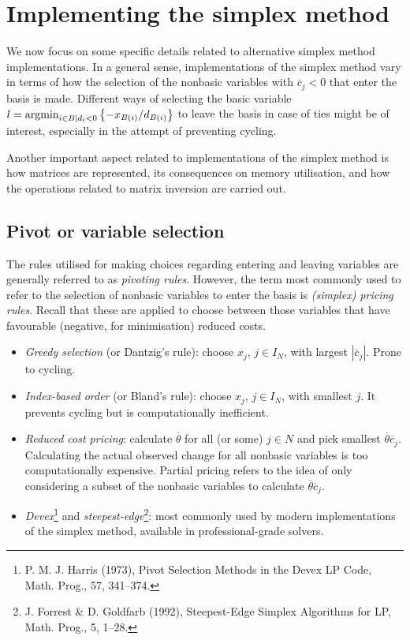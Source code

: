 \section{Implementing the simplex method}

We now focus on some specific details related to alternative simplex method implementations. In a general sense, implementations of the simplex method vary in terms of how the selection of the nonbasic variables with $\overline{c}_j < 0$ that enter the basis is made. Different ways of selecting the basic variable $l = \mathop{\rm argmin}_{i \in B \mid d_i <0}\left\{ -x_{B(i)}/d_{B(i)} \right \}$ to leave the basis in case of ties might be of interest, especially in the attempt of preventing cycling.

Another important aspect related to implementations of the simplex method is how matrices are represented, its consequences on memory utilisation, and how the operations related to matrix inversion are carried out. 


\subsection{Pivot or variable selection}

The rules utilised for making choices regarding entering and leaving variables are generally referred to as \emph{pivoting rules}. However, the term most commonly used to refer to the selection of nonbasic variables to enter the basis is \emph{(simplex) pricing rules}. Recall that these are applied to choose between those variables that have favourable (negative, for minimisation) reduced costs.

\begin{itemize}
	\item \emph{Greedy selection} (or Dantzig's rule): choose $x_j$, $j \in I_N$, with largest $|\overline{c}_j|$. Prone to cycling.
	\item \emph{Index-based order} (or Bland's rule): choose $x_j$,  $j \in I_N$, with smallest $j$. It prevents cycling but is computationally inefficient. 
	\item \emph{Reduced cost pricing}: calculate $\overline{\theta}$ for all (or some) $j \in N$ and pick smallest $\overline{\theta}\overline{c}_j$. Calculating the actual observed change for all nonbasic variables is too computationally expensive. Partial pricing refers to the idea of only considering a subset of the nonbasic variables to calculate $\overline{\theta}\overline{c}_j$.
	\item \emph{Devex}\footnote{P. M. J. Harris (1973), Pivot Selection Methods in the Devex LP Code, Math. Prog., 57, 341--374.} and \emph{steepest-edge}\footnote{J. Forrest \& D. Goldfarb (1992), Steepest-Edge Simplex Algorithms for LP, Math. Prog., 5, 1--28.}: most commonly used by modern implementations of the simplex method, available in professional-grade solvers. 
\end{itemize}


